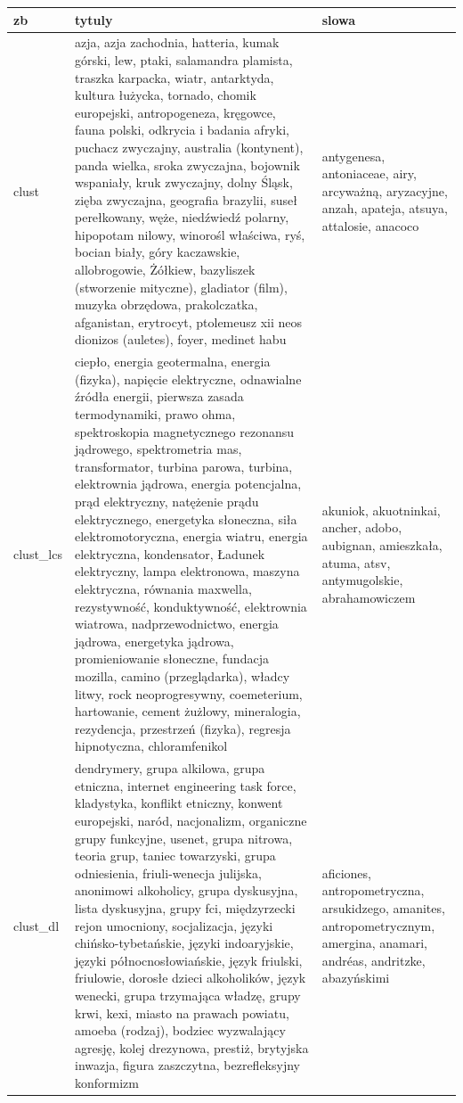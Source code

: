 \documentclass{praca1}
\begin{document}
\begin{table}[ht]
\centering
\begin{tabular}{lll}
 zb & tytuly & slowa \\ 
  \hline
clust & azja, azja zachodnia, hatteria, kumak górski, lew, ptaki, salamandra plamista, traszka karpacka, wiatr, antarktyda, kultura łużycka, tornado, chomik europejski, antropogeneza, kręgowce, fauna polski, odkrycia i badania afryki, puchacz zwyczajny, australia (kontynent), panda wielka, sroka zwyczajna, bojownik wspaniały, kruk zwyczajny, dolny Śląsk, zięba zwyczajna, geografia brazylii, suseł perełkowany, węże, niedźwiedź polarny, hipopotam nilowy, winorośl właściwa, ryś, bocian biały, góry kaczawskie, allobrogowie, Żółkiew, bazyliszek (stworzenie mityczne), gladiator (film), muzyka obrzędowa, prakolczatka, afganistan, erytrocyt, ptolemeusz xii neos dionizos (auletes), foyer, medinet habu & antygenesa, antoniaceae, airy, arcyważną, aryzacyjne, anzah, apateja, atsuya, attalosie, anacoco \\ 
   \hline
clust\_lcs & ciepło, energia geotermalna, energia (fizyka), napięcie elektryczne, odnawialne źródła energii, pierwsza zasada termodynamiki, prawo ohma, spektroskopia magnetycznego rezonansu jądrowego, spektrometria mas, transformator, turbina parowa, turbina, elektrownia jądrowa, energia potencjalna, prąd elektryczny, natężenie prądu elektrycznego, energetyka słoneczna, siła elektromotoryczna, energia wiatru, energia elektryczna, kondensator, Ładunek elektryczny, lampa elektronowa, maszyna elektryczna, równania maxwella, rezystywność, konduktywność, elektrownia wiatrowa, nadprzewodnictwo, energia jądrowa, energetyka jądrowa, promieniowanie słoneczne, fundacja mozilla, camino (przeglądarka), władcy litwy, rock neoprogresywny, coemeterium, hartowanie, cement żużlowy, mineralogia, rezydencja, przestrzeń (fizyka), regresja hipnotyczna, chloramfenikol & akuniok, akuotninkai, ancher, adobo, aubignan, amieszkała, atuma, atsv, antymugolskie, abrahamowiczem \\ 
   \hline
clust\_dl & dendrymery, grupa alkilowa, grupa etniczna, internet engineering task force, kladystyka, konflikt etniczny, konwent europejski, naród, nacjonalizm, organiczne grupy funkcyjne, usenet, grupa nitrowa, teoria grup, taniec towarzyski, grupa odniesienia, friuli-wenecja julijska, anonimowi alkoholicy, grupa dyskusyjna, lista dyskusyjna, grupy fci, międzyrzecki rejon umocniony, socjalizacja, języki chińsko-tybetańskie, języki indoaryjskie, języki północnosłowiańskie, język friulski, friulowie, dorosłe dzieci alkoholików, język wenecki, grupa trzymająca władzę, grupy krwi, kexi, miasto na prawach powiatu, amoeba (rodzaj), bodziec wyzwalający agresję, kolej drezynowa, prestiż, brytyjska inwazja, figura zaszczytna, bezrefleksyjny konformizm & aficiones, antropometryczna, arsukidzego, amanites, antropometrycznym, amergina, anamari, andréas, andritzke, abazyńskimi \\ 

\end{tabular}
\end{table}
\end{document}
